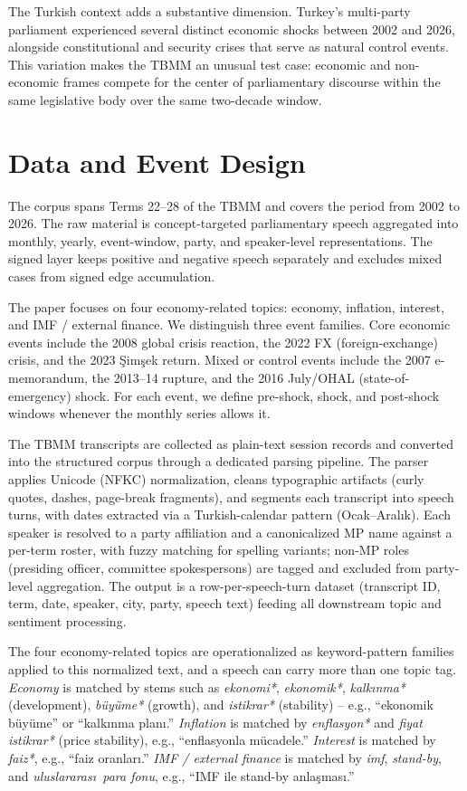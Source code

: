 \documentclass[11pt]{article}
\begin{document}
The Turkish context adds a substantive dimension. Turkey's multi-party parliament experienced several distinct economic shocks between 2002 and 2026, alongside constitutional and security crises that serve as natural control events. This variation makes the TBMM an unusual test case: economic and non-economic frames compete for the center of parliamentary discourse within the same legislative body over the same two-decade window.

\section{Data and Event Design}
The corpus spans Terms 22--28 of the TBMM and covers the period from 2002 to 2026. The raw material is concept-targeted parliamentary speech aggregated into monthly, yearly, event-window, party, and speaker-level representations. The signed layer keeps positive and negative speech separately and excludes mixed cases from signed edge accumulation.

The paper focuses on four economy-related topics: economy, inflation, interest, and IMF / external finance. We distinguish three event families. Core economic events include the 2008 global crisis reaction, the 2022 FX (foreign-exchange) crisis, and the 2023 \c{S}im\c{s}ek return. Mixed or control events include the 2007 e-memorandum, the 2013--14 rupture, and the 2016 July/OHAL (state-of-emergency) shock. For each event, we define pre-shock, shock, and post-shock windows whenever the monthly series allows it.

The TBMM transcripts are collected as plain-text session records and converted into the structured corpus through a dedicated parsing pipeline. The parser applies Unicode (NFKC) normalization, cleans typographic artifacts (curly quotes, dashes, page-break fragments), and segments each transcript into speech turns, with dates extracted via a Turkish-calendar pattern (Ocak--Aral\i k). Each speaker is resolved to a party affiliation and a canonicalized MP name against a per-term roster, with fuzzy matching for spelling variants; non-MP roles (presiding officer, committee spokespersons) are tagged and excluded from party-level aggregation. The output is a row-per-speech-turn dataset (transcript ID, term, date, speaker, city, party, speech text) feeding all downstream topic and sentiment processing.

The four economy-related topics are operationalized as keyword-pattern families applied to this normalized text, and a speech can carry more than one topic tag. \emph{Economy} is matched by stems such as \emph{ekonomi*}, \emph{ekonomik*}, \emph{kalk\i nma*} (development), \emph{b\"uy\"ume*} (growth), and \emph{istikrar*} (stability) -- e.g., ``ekonomik b\"uy\"ume'' or ``kalk\i nma plan\i.'' \emph{Inflation} is matched by \emph{enflasyon*} and \emph{fiyat istikrar*} (price stability), e.g., ``enflasyonla m\"ucadele.'' \emph{Interest} is matched by \emph{faiz*}, e.g., ``faiz oranlar\i.'' \emph{IMF / external finance} is matched by \emph{imf}, \emph{stand-by}, and \emph{uluslararas\i\ para fonu}, e.g., ``IMF ile stand-by anla\c{s}mas\i.''
\end{document}
